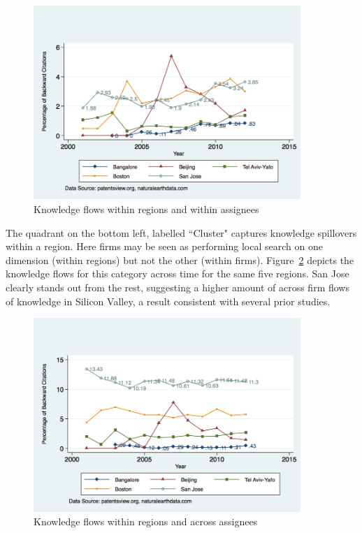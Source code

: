 \documentclass[12pt,letterpaper]{article}
\begin{document}
\begin{figure}[h]
\begin{centering}
  \caption{Knowledge flows within regions and within assignees}
  \label{fig:SMSSameRegionSameAssigneeFlows}
  \includegraphics[width=0.90\textwidth]{SMSSameRegionSameAssigneeFlows}
\end{centering}
\end{figure}


The quadrant on the bottom left, labelled ``Cluster" captures knowledge spillovers within a region. Here firms may be seen as performing local search on one dimension (within regions) but not the other (within firms). Figure~\ref{fig:SMSSameRegionDiffAssigneeFlows} depicts the knowledge flows for this category across time for the same five regions. San Jose clearly stands out from the rest, suggesting a higher amount of across firm flows of knowledge in Silicon Valley, a result consistent with several prior studies\citep{todo}. \par

\begin{figure}[h!]
\begin{centering}
  \caption{Knowledge flows within regions and across assignees}
  \label{fig:SMSSameRegionDiffAssigneeFlows}
  \includegraphics[width=0.90\textwidth]{SMSSameRegionDiffAssigneeFlows}
\end{centering}
\end{figure}
\end{document}
